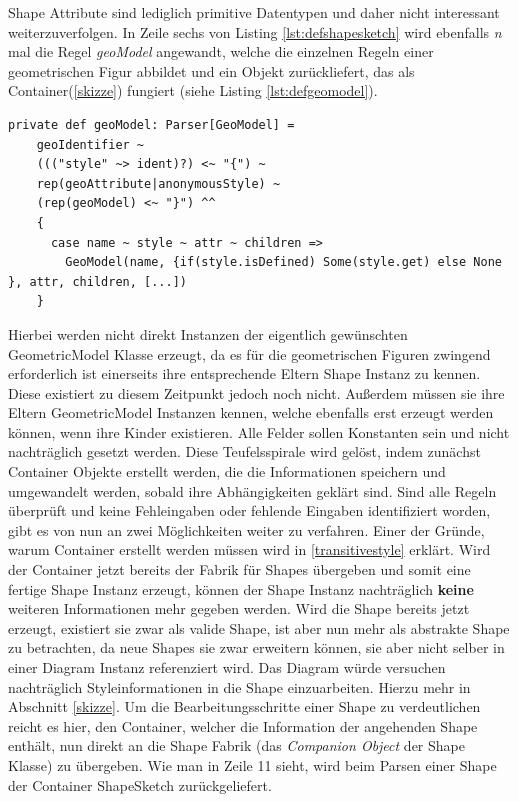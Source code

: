 Shape Attribute sind lediglich primitive Datentypen und daher nicht interessant weiterzuverfolgen. In Zeile sechs von Listing \ref{lst:defshapesketch} wird ebenfalls \textit{n} mal die Regel \textit{geoModel} angewandt, welche die einzelnen Regeln einer geometrischen Figur abbildet und ein Objekt zurückliefert, das als Container(\ref{skizze}) fungiert (siehe Listing \ref{lst:defgeomodel}).
\begin{lstlisting}[style=scala, caption = {Regel zum Parsen geometrischer Figuren}, label = {lst:defgeomodel}]
private def geoModel: Parser[GeoModel] =
    geoIdentifier ~
    ((("style" ~> ident)?) <~ "{") ~
    rep(geoAttribute|anonymousStyle) ~
    (rep(geoModel) <~ "}") ^^
    {
      case name ~ style ~ attr ~ children =>
        GeoModel(name, {if(style.isDefined) Some(style.get) else None }, attr, children, [...])
    }
\end{lstlisting}Hierbei werden nicht direkt Instanzen der eigentlich gewünschten GeometricModel Klasse erzeugt, da es für die geometrischen Figuren zwingend erforderlich ist einerseits ihre entsprechende Eltern Shape Instanz zu kennen. Diese existiert zu diesem Zeitpunkt jedoch noch nicht. Außerdem müssen sie ihre Eltern GeometricModel Instanzen kennen, welche ebenfalls erst erzeugt werden können, wenn ihre Kinder existieren. Alle Felder sollen Konstanten sein und nicht nachträglich gesetzt werden. Diese Teufelsspirale wird gelöst, indem zunächst Container Objekte erstellt werden, die die Informationen speichern und umgewandelt werden, sobald ihre Abhängigkeiten geklärt sind. Sind alle Regeln überprüft und keine Fehleingaben oder fehlende Eingaben identifiziert worden, gibt es von nun an zwei Möglichkeiten weiter zu verfahren. Einer der Gründe, warum Container erstellt werden müssen wird in \ref{transitivestyle} erklärt. Wird der Container jetzt bereits der Fabrik für Shapes übergeben und somit eine fertige Shape Instanz erzeugt, können der Shape Instanz nachträglich \textbf{keine} weiteren Informationen mehr gegeben werden.
Wird die Shape bereits jetzt erzeugt, existiert sie zwar als valide Shape, ist aber nun mehr als abstrakte Shape zu betrachten, da neue Shapes sie zwar erweitern können, sie aber nicht selber in einer Diagram Instanz referenziert wird. Das Diagram würde versuchen nachträglich Styleinformationen in die Shape einzuarbeiten. Hierzu mehr in Abschnitt \ref{skizze}. Um die Bearbeitungsschritte einer Shape zu verdeutlichen reicht es hier, den Container, welcher die Information der angehenden Shape enthält, nun direkt an die Shape Fabrik (das \textit{Companion Object} der Shape Klasse) zu übergeben. Wie man in Zeile 11 sieht, wird beim Parsen einer Shape der Container ShapeSketch zurückgeliefert.
